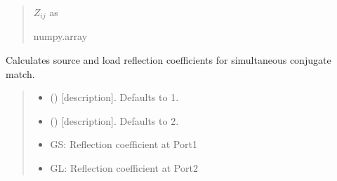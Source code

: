 \documentclass[letterpaper,10pt,english]{sphinxmanual}
\begin{document}
\begin{fulllineitems}
\begin{fulllineitems}
\begin{quote}
\begin{description}
\begin{itemize}
\end{itemize}

\sphinxAtStartPar
\(Z_{i j}\) as 

\sphinxAtStartPar
numpy.array

\end{description}\end{quote}

\end{fulllineitems}


\begin{fulllineitems}
\label{\detokenize{touchstone:touchstone.spfile.Z_conjmatch}}
\pysigstartsignatures
{}
\pysigstopsignatures
\sphinxAtStartPar
Calculates source and load reflection coefficients for simultaneous conjugate match.
\begin{quote}\begin{description}
\begin{itemize}
\item {} 
\sphinxAtStartPar
{} (\sphinxstyleliteralemphasis{\sphinxupquote{, }}) \textendash{} {[}description{]}. Defaults to 1.

\item {} 
\sphinxAtStartPar
{} (\sphinxstyleliteralemphasis{\sphinxupquote{, }}) \textendash{} {[}description{]}. Defaults to 2.

\end{itemize}

\sphinxAtStartPar
\begin{itemize}
\item {} 
\sphinxAtStartPar
GS: Reflection coefficient at Port\sphinxhyphen{}1

\item {} 
\sphinxAtStartPar
GL: Reflection coefficient at Port\sphinxhyphen{}2


\end{itemize}
\end{description}
\end{quote}
\end{fulllineitems}
\end{fulllineitems}
\end{document}
